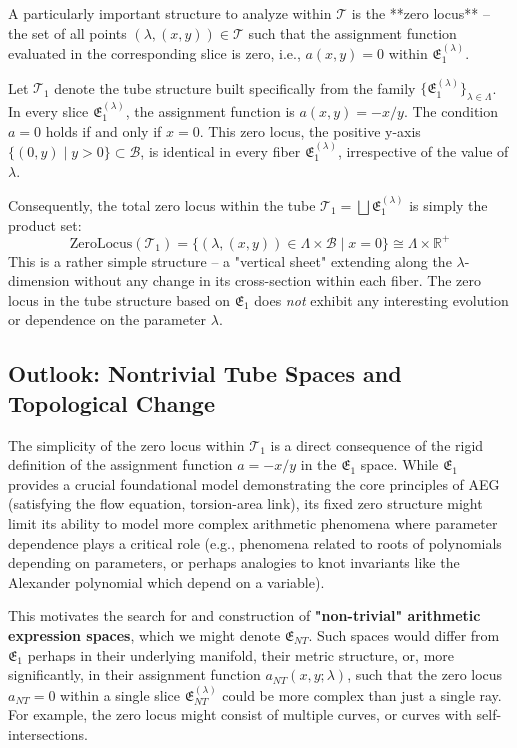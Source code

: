 \documentclass[12pt]{article}
\begin{document}
A particularly important structure to analyze within \( \mathcal{T} \) is the **zero locus** – the set of all points \( (\lambda, (x, y)) \in \mathcal{T} \) such that the assignment function evaluated in the corresponding slice is zero, i.e., \( a(x, y) = 0 \) within \( \mathfrak{E}_1^{(\lambda)} \).

Let \( \mathcal{T}_1 \) denote the tube structure built specifically from the family \( \{ \mathfrak{E}_1^{(\lambda)} \}_{\lambda \in \Lambda} \). In every slice \( \mathfrak{E}_1^{(\lambda)} \), the assignment function is \( a(x, y) = -x/y \). The condition \( a = 0 \) holds if and only if \( x = 0 \). This zero locus, the positive y-axis \( \{(0, y) \mid y > 0\} \subset \mathcal{B} \), is identical in every fiber \( \mathfrak{E}_1^{(\lambda)} \), irrespective of the value of \( \lambda \).

Consequently, the total zero locus within the tube \( \mathcal{T}_1 = \bigsqcup \mathfrak{E}_1^{(\lambda)} \) is simply the product set:
\[
\text{ZeroLocus}(\mathcal{T}_1) = \{ (\lambda, (x, y)) \in \Lambda \times \mathcal{B} \mid x = 0 \} \cong \Lambda \times \mathbb{R}^+
\]
This is a rather simple structure – a "vertical sheet" extending along the \( \lambda \)-dimension without any change in its cross-section within each fiber. The zero locus in the tube structure based on \( \mathfrak{E}_1 \) does \emph{not} exhibit any interesting evolution or dependence on the parameter \( \lambda \).

\subsection{Outlook: Nontrivial Tube Spaces and Topological Change} %

The simplicity of the zero locus within \( \mathcal{T}_1 \) is a direct consequence of the rigid definition of the assignment function \( a = -x/y \) in the \( \mathfrak{E}_1 \) space. While \( \mathfrak{E}_1 \) provides a crucial foundational model demonstrating the core principles of AEG (satisfying the flow equation, torsion-area link), its fixed zero structure might limit its ability to model more complex arithmetic phenomena where parameter dependence plays a critical role (e.g., phenomena related to roots of polynomials depending on parameters, or perhaps analogies to knot invariants like the Alexander polynomial which depend on a variable).

This motivates the search for and construction of \textbf{"non-trivial" arithmetic expression spaces}, which we might denote \( \mathfrak{E}_{NT} \). Such spaces would differ from \( \mathfrak{E}_1 \) perhaps in their underlying manifold, their metric structure, or, more significantly, in their assignment function \( a_{NT}(x, y; \lambda) \), such that the zero locus \( a_{NT} = 0 \) within a single slice \( \mathfrak{E}_{NT}^{(\lambda)} \) could be more complex than just a single ray. For example, the zero locus might consist of multiple curves, or curves with self-intersections.
\end{document}
